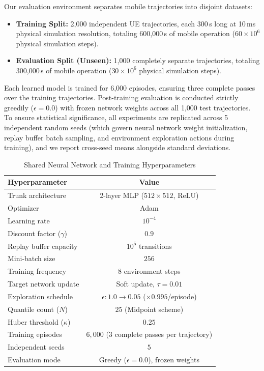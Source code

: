 \documentclass{ieeetmlcn}
\begin{document}
Our evaluation environment separates mobile trajectories into disjoint datasets:
\begin{itemize}\setlength\itemsep{0.5pt}\setlength\parskip{0pt}
    \item \textbf{Training Split:} 2,000 independent UE trajectories, each 300\,s long at 10\,ms physical simulation resolution, totaling 600,000\,s of mobile operation ($60 \times 10^6$ physical simulation steps).
    \item \textbf{Evaluation Split (Unseen):} 1,000 completely separate trajectories, totaling 300,000\,s of mobile operation ($30 \times 10^6$ physical simulation steps).
\end{itemize}
Each learned model is trained for 6,000 episodes, ensuring three complete passes over the training trajectories. Post-training evaluation is conducted strictly greedily ($\epsilon = 0.0$) with frozen network weights across all 1,000 test trajectories. To ensure statistical significance, all experiments are replicated across 5 independent random seeds (which govern neural network weight initialization, replay buffer batch sampling, and environment exploration actions during training), and we report cross-seed means alongside standard deviations.

\begin{table}[t]
\caption{Shared Neural Network and Training Hyperparameters}
\label{tab:hparams}
\centering
\begin{tabular}{|l|c|}
\hline
\textbf{Hyperparameter} & \textbf{Value} \\
\hline
Trunk architecture       & 2-layer MLP ($512 \times 512$, ReLU) \\
Optimizer               & Adam \\
Learning rate           & $10^{-4}$ \\
Discount factor ($\gamma$) & $0.9$ \\
Replay buffer capacity  & $10^{5}$ transitions \\
Mini-batch size         & $256$ \\
Training frequency      & $8$ environment steps \\
Target network update   & Soft update, $\tau = 0.01$ \\
Exploration schedule    & $\epsilon: 1.0 \to 0.05$ ($\times 0.995$/episode) \\
Quantile count ($N$)    & $25$ (Midpoint scheme) \\
Huber threshold ($\kappa$) & $0.25$ \\
Training episodes       & $6{,}000$ (3 complete passes per trajectory) \\
Independent seeds       & $5$ \\
Evaluation mode         & Greedy ($\epsilon = 0.0$), frozen weights \\
\hline
\end{tabular}
\end{table}
\end{document}
